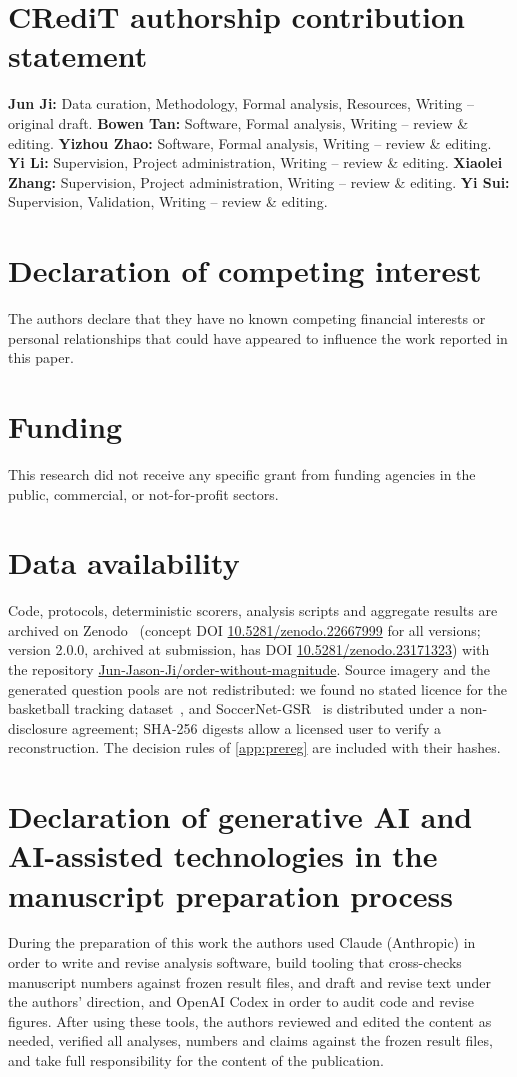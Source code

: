 \documentclass[preprint,number]{elsarticle}
\begin{document}
\section*{CRediT authorship contribution statement}
\textbf{Jun Ji:} Data curation, Methodology, Formal analysis, Resources,
Writing -- original draft. \textbf{Bowen Tan:} Software, Formal analysis,
Writing -- review \& editing. \textbf{Yizhou Zhao:} Software, Formal analysis,
Writing -- review \& editing. \textbf{Yi Li:} Supervision, Project
administration, Writing -- review \& editing. \textbf{\mbox{Xiaolei} Zhang:}
Supervision, Project administration, Writing -- review \& editing. \textbf{Yi
Sui:} Supervision, Validation, Writing -- review \& editing.

\section*{Declaration of competing interest}
The authors declare that they have no known competing financial interests or
personal relationships that could have appeared to influence the work reported
in this paper.

\section*{Funding}
This research did not receive any specific grant from funding agencies in the
public, commercial, or not-for-profit sectors.

\section*{Data availability}
Code, protocols, deterministic scorers, analysis scripts and aggregate results
are archived on Zenodo~\cite{owm_software2026}
(concept DOI \url{10.5281/zenodo.22667999} for all versions; version 2.0.0,
archived at submission, has DOI \url{10.5281/zenodo.23171323}) with the
repository \url{Jun-Jason-Ji/order-without-magnitude}. Source imagery
and the generated question pools are not redistributed: we found no stated
licence for the basketball tracking dataset~\cite{teamtrack2024}, and
SoccerNet-GSR~\cite{soccernetgsr2024} is distributed under a non-disclosure
agreement; SHA-256 digests allow a licensed user to verify a reconstruction.
The decision rules of \ref{app:prereg} are included with their hashes.

\section*{Declaration of generative AI and AI-assisted technologies in
the\\ manuscript preparation process}
During the preparation of this work the authors used Claude (Anthropic)
in order to write and revise analysis software, build tooling that
cross-checks manuscript numbers against frozen result files, and draft and
revise text under the authors' direction, and OpenAI Codex in order to audit
code and revise figures. After using these tools, the authors reviewed and
edited the content as needed, verified all analyses, numbers and claims against
the frozen result files, and take full responsibility for the content of the
publication.
\end{document}
